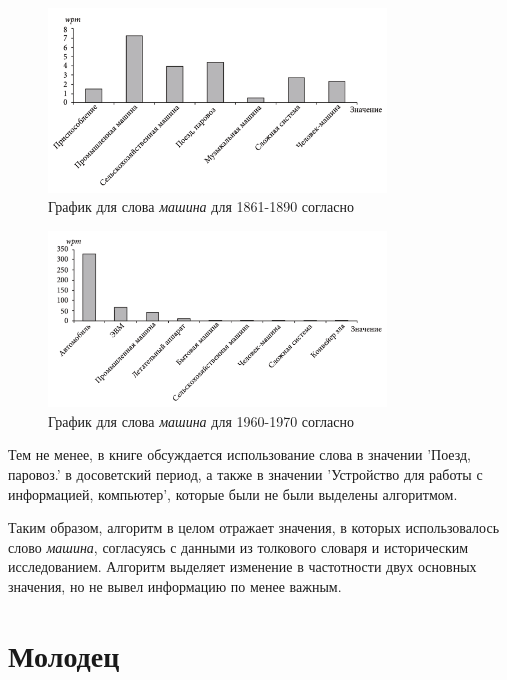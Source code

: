 \noindent %
\begin{figure}[H]
    \centering %
    \includegraphics[width=0.8\textwidth]{img/book/mashina/1861-1890}
    \caption{График для слова \textit{машина} для 1861-1890 согласно~\cite{TwoCenturies}}
    \label{fig:TwoCenturiesMashina1}
\end{figure}

\begin{figure}[H]
    \centering %
    \includegraphics[width=0.8\textwidth]{img/book/mashina/1960-1970}
    \caption{График для слова \textit{машина} для 1960-1970 согласно~\cite{TwoCenturies}}
    \label{fig:TwoCenturiesMashina2}
\end{figure}

Тем не менее, в книге обсуждается использование слова в значении ’Поезд, паровоз.’
в досоветский период, а также в значении ’Устройство для работы с информацией, компьютер’,
которые были не были выделены алгоритмом.

Таким образом, алгоритм в целом отражает значения, в которых использовалось
слово \textit{машина}, согласуясь с данными из толкового словаря и историческим исследованием.
Алгоритм выделяет изменение в частотности двух основных значения, но не вывел информацию по менее важным.

\section*{Молодец}

